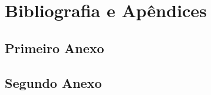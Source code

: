 \documentclass[portuguese]{ist-thesis}
\begin{document}
\lipsum %

\nocite{latex-companion, fontcatalogue, latexwiki, ctan, texsx}

\part{Bibliografia e Apêndices}

\printbibliography[heading = bibintoc]

\appendix

\chapter{Primeiro Anexo}

\lipsum

\chapter{Segundo Anexo}

\lipsum
\end{document}
